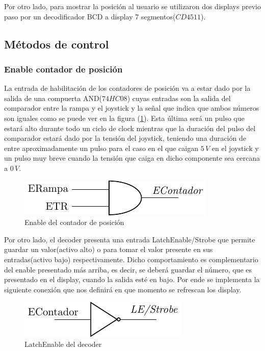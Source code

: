 Por otro lado, para mostrar la posición al usuario se utilizaron dos displays previo paso por un decodificador BCD a display 7 segmentos($CD4511$).



\subsection{Métodos de control}

\subsubsection{Enable contador de posición}
La entrada de habilitación de los contadores de posición va a estar dado por la salida de una compuerta AND($74HC08$) cuyas entradas son la salida del comparador entre la rampa y el joystick y la señal que indica que ambos números son iguales como se puede ver en la figura (\ref{fig:enable}). Esta última será un pulso que estará alto durante todo un ciclo de clock mientras que la duración del pulso del comparador estará dado por la tensión del joystick, teniendo una duración de entre aproximadamente un pulso para el caso en el que caigan $5\,V$ en el joystick y un pulso muy breve cuando la tensión que caiga en dicho componente sea cercana a $0\,V$. 

\par
\begin{figure}[H]
\centering
\includegraphics[scale=0.8]{Ejercicio8/Circuitos/Enable.pdf}
\caption{Enable del contador de posición}
\label{fig:enable}
\end{figure}

Por otro lado, el decoder presenta una entrada LatchEnable/Strobe que permite guardar un valor(activo alto) o para tomar el valor presente en sus entradas(activo bajo) respectivamente. Dicho comportamiento es complementario del enable presentado más arriba, es decir, se deberá guardar el número, que es presentado en el display, cuando la salida esté en bajo. Por ende se implementa la siguiente conexión que nos definirá en que momento se refrescan los display.
\par
\begin{figure}[H]
\centering
\includegraphics[scale=0.8]{Ejercicio8/Circuitos/not.pdf}
\caption{LatchEnable del decoder}
\label{fig:not}
\end{figure}


